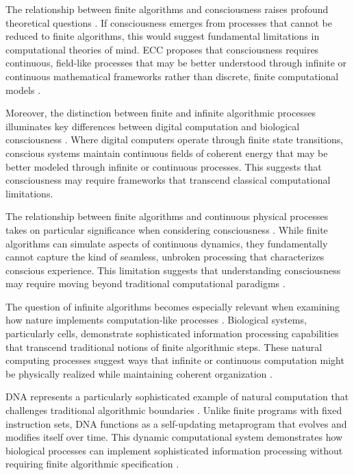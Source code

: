 \begin{refsection}
The relationship between finite algorithms and consciousness raises profound theoretical questions \cite{Hofstadter1999}. If consciousness emerges from processes that cannot be reduced to finite algorithms, this would suggest fundamental limitations in computational theories of mind. ECC proposes that consciousness requires continuous, field-like processes that may be better understood through infinite or continuous mathematical frameworks rather than discrete, finite computational models \cite{Floyd2014}.

Moreover, the distinction between finite and infinite algorithmic processes illuminates key differences between digital computation and biological consciousness \cite{Kozen2006}. Where digital computers operate through finite state transitions, conscious systems maintain continuous fields of coherent energy that may be better modeled through infinite or continuous processes. This suggests that consciousness may require frameworks that transcend classical computational limitations.

The relationship between finite algorithms and continuous physical processes takes on particular significance when considering consciousness \cite{PourEl1989}. While finite algorithms can simulate aspects of continuous dynamics, they fundamentally cannot capture the kind of seamless, unbroken processing that characterizes conscious experience. This limitation suggests that understanding consciousness may require moving beyond traditional computational paradigms \cite{Sipser2012}.

The question of infinite algorithms becomes especially relevant when examining how nature implements computation-like processes \cite{Soare2016}. Biological systems, particularly cells, demonstrate sophisticated information processing capabilities that transcend traditional notions of finite algorithmic steps. These natural computing processes suggest ways that infinite or continuous computation might be physically realized while maintaining coherent organization \cite{vanLeeuwen2012}.

DNA represents a particularly sophisticated example of natural computation that challenges traditional algorithmic boundaries \cite{Wegner2003}. Unlike finite programs with fixed instruction sets, DNA functions as a self-updating metaprogram that evolves and modifies itself over time. This dynamic computational system demonstrates how biological processes can implement sophisticated information processing without requiring finite algorithmic specification \cite{Deutsch2011}.


\end{refsection}
